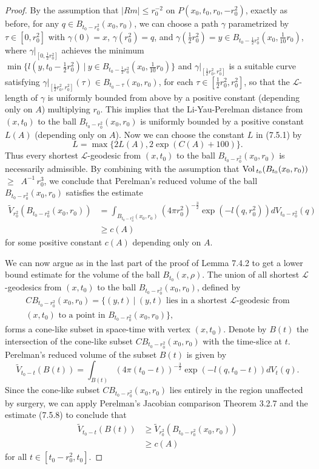 \begin{proof}
By the assumption that $|Rm|\leq r^{-2}_0$ on
$P(x_0,t_0,r_0,-r^2_0)$, exactly as before, for any $q\in
B_{t_0-r^2_0}(x_0,r_0)$, we can choose a path $\gamma$
parametrized by $\tau\in[0,r^2_0]$ with $\gamma(0)=x$,
$\gamma(r^2_0)=q$, and $\gamma(\frac{1}{2}r^2_0)=y\in
B_{t_0-\frac{1}{2}r^2_0}(x_0,\frac{1}{10}r_0)$, where
$\gamma|_{[0,\frac{1}{2}r^2_0]}$ achieves the minimum
$\min\{l(y,t_0-\frac{1}{2}r^2_0)\ |\ y\in
B_{t_0-\frac{1}{2}r^2_0}(x_0,\frac{1}{10}r_0)\}$ and
$\gamma|_{[\frac{1}{2}r^2_0,r^2_0]}$ is a suitable curve
satisfying $\gamma|_{[\frac{1}{2}r^2_0,r^2_0]}(\tau) \in B_{t_0 -
\tau}(x_0,r_0)$, for each $\tau \in [\frac{1}{2}r^2_0,r^2_0]$, so
that the $\mathcal{L}$-length of $\gamma$ is uniformly bounded
from above by a positive constant (depending only on $A$)
multiplying $r_0$. This implies that the Li-Yau-Perelman distance
from $(x,t_0)$ to the ball $B_{t_0-r^2_0}(x_0,r_0)$ is uniformly
bounded by a positive constant $L(A)$ (depending only on $A$). Now
we can choose the constant $L$ in (7.5.1) by
$$
L=\max\{2L(A),2\exp(C(A)+100)\}.
$$
Thus every shortest $\mathcal{L}$-geodesic from $(x,t_0)$ to the
ball $B_{t_0-r^2_0}(x_0,r_0)$ is necessarily admissible. By
combining with the assumption that ${\rm Vol}\,_{t_0}(B_{t_0}(x_0,r_0))$
$\geq\; \;A^{-1}\,r^3_0$,\; we\; conclude\; that\; Perelman's\;
reduced\; volume\; of\; the\; ball $B_{t_0-r^2_0}(x_0,r_0)$
satisfies the estimate
\begin{align}
\widetilde{V}_{r^2_0}(B_{t_0-r^2_0}(x_0,r_0)) &  =
\int_{B_{t_0-r^2_0}(x_0,r_0)}
(4\pi r^2_0)^{-\frac{3}{2}}\exp(-l(q,r^2_0))dV_{t_0-r^2_0}(q)\\
&  \geq c(A) \nonumber
\end{align}  %
for some positive constant $c(A)$ depending only on $A$.

We can now argue as in the last part of the proof of Lemma 7.4.2
to get a lower bound estimate for the volume of the ball
$B_{t_0}(x,\rho)$. The union of all shortest
$\mathcal{L}$-geodesics from $(x,t_0)$ to the ball
$B_{t_0-r^2_0}(x_0,r_0)$, defined by
\begin{multline*}
CB_{t_0-r^2_0}(x_0,r_0)=\{(y,t)\ |\ (y,t)
\mbox{ lies in a shortest $\mathcal{L}$-geodesic from}\\
(x,t_0)\mbox{ to a point in }B_{t_0-r^2_0}(x_0,r_0)\},
\end{multline*}
forms a cone-like subset in space-time with vertex $(x,t_0)$.
Denote by $B(t)$ the intersection of the cone-like subset
$CB_{t_0-r^2_0}(x_0,r_0)$ with the time-slice at $t$. Perelman's
reduced volume of the subset $B(t)$ is given by
$$
\widetilde{V}_{t_0-t}(B(t))=\int_{B(t)}(4\pi(t_0-t))^{-\frac{3}{2}}
\exp(-l(q,t_0-t))dV_t(q).
$$
Since the cone-like subset $CB_{t_0-r^2_0}(x_0,r_0)$ lies entirely
in the region unaffected by surgery, we can apply Perelman's
Jacobian comparison Theorem 3.2.7 and the estimate (7.5.8) to
conclude that
\begin{align}
\widetilde{V}_{t_0-t}(B(t))&  \geq
\widetilde{V}_{r^2_0}(B_{t_0-r^2_0}(x_0,r_0))\\
&  \geq c(A) \nonumber
\end{align}         %
for all $t\in[t_0-r^2_0,t_0]$.


\end{proof}
